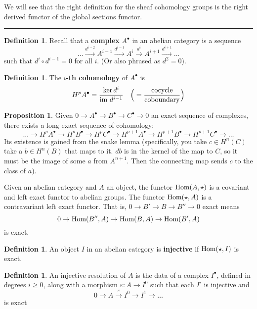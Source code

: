 \documentclass[10pt,reqno]{amsart}
\theoremstyle{definition}
\newtheorem{definition}[theorem]{Definition}
\newtheorem{proposition}[theorem]{Proposition}
\theoremstyle{remark}
\numberwithin{equation}{section}
\numberwithin{theorem}{section}
\newcommand{\Hom}{\textup{Hom}}
\newcommand{\im}{\textup{im}}
\begin{document}
We will see that the right definition for the sheaf cohomology groups is the right derived functor of the global sections functor.
\\

\hrule
\vspace{1em}

\begin{definition}
Recall that a \textbf{complex} $A^{\bullet}$ in an abelian category is a sequence 
\[\dots \stackrel{d^{i-2}}{\longrightarrow} A^{i-1} \stackrel{d^{i-1}}{\longrightarrow} A^i \stackrel{d^i}{\longrightarrow} A^{i+1} \stackrel{d^{i+1}}{\longrightarrow} \dots\]
such that $d^i \circ d^{i-1} = 0$ for all $i$. (Or also phrased as $d^2 = 0$).
\end{definition}

\begin{definition} The \textbf{$i$-th cohomology} of $A^{\bullet}$ is
\[H^p A^{\bullet} = \frac{\ker d^i}{\im \ d^{i-1}} \ \ \ \Big( = \frac{\textup{cocycle}}{\textup{coboundary}} \Big)\]
\end{definition}

\begin{proposition} Given $0 \to A^{\bullet} \to B^{\bullet} \to C^{\bullet} \to 0$ an exact sequence of complexes, there exists a long exact sequence of cohomology:
\[ \dots \to H^p A^{\bullet} \to H^p B^{\bullet} \to H^p C^{\bullet} \to H^{p+1} A^{\bullet} \to H^{p+1} B^{\bullet} \to H^{p+1} C^{\bullet} \to \dots\]
Its existence is gained from the snake lemma (specifically, you take $c \in H^n(C)$ take a $b \in H^n(B)$ that maps to it. $db$ is in the kernel of the map to $C$, so it must be the image of some $a$ from $A^{n+1}$. Then the connecting map sends $c$ to the class of $a$).
\end{proposition}

Given an abelian category and $A$ an object, the functor $\Hom(A, \star)$ is a covariant and left exact functor to abelian groups. The functor $\Hom(\star, A)$ is a contravariant left exact functor. That is, $0 \to B' \to B \to B'' \to 0$ exact means 
\[0 \to \Hom(B'',A) \to \Hom(B,A) \to \Hom(B',A)\]
is exact.

\begin{definition} An object $I$ in an abelian category is \textbf{injective} if $\Hom( \star, I)$ is exact.
\end{definition}

\begin{definition} An injective resolution of $A$ is the data of a complex $I^{\bullet}$, defined in degrees $i \ge 0$, along with a morphism $\varepsilon: A \to I^0$ such that each $I^i$ is injective and 
\[0 \to A \stackrel{\varepsilon}{\to} I^0 \to I^1 \to \dots \]
is exact
\end{definition}
\end{document}
